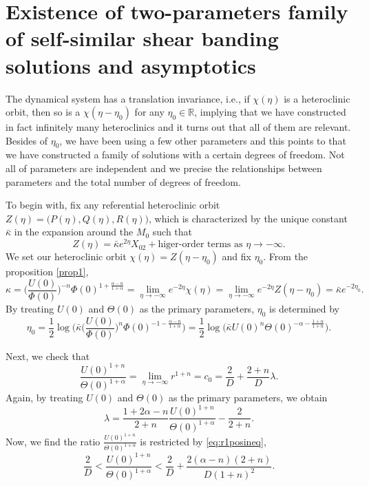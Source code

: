 \documentclass[a4paper,11pt]{article}
\begin{document}
\section{Existence of two-parameters family of self-similar shear banding solutions and asymptotics}
The dynamical system has a translation invariance, i.e., if $\chi(\eta)$ is a heteroclinic orbit, then so is a $\chi(\eta-\eta_0)$ for any $\eta_0\in \mathbb{R}$, implying that we have constructed in fact infinitely many heteroclinics and it turns out that all of them are relevant.  Besides of $\eta_0$, we have been using a few other parameters and this points to that we have constructed a family of solutions with a certain degrees of freedom. Not all of parameters are independent and we precise the relationships between parameters and the total number of degrees of freedom.

To begin with, fix any referential heteroclinic orbit $Z(\eta)=\big(P(\eta),Q(\eta),R(\eta)\big)$, which is characterized by the unique constant $\bar{\kappa}$ in the expansion around the $M_0$ such that
$$ Z(\eta) = \bar{\kappa}e^{2\eta}X_{02} + \text{higer-order terms as $\eta \rightarrow -\infty$.}$$%
We set our heteroclinic orbit $\chi(\eta) = Z(\eta-\eta_0)$ and fix $\eta_0$. From the proposition \ref{prop1}, 
$$ \kappa = \Big(\frac{U(0)}{\Phi(0)}\Big)^{-n}\Phi(0)^{1+\frac{\alpha-n}{1+\alpha}}=\lim_{\eta \rightarrow -\infty} e^{-2\eta}\chi(\eta)  = \lim_{\eta \rightarrow -\infty} e^{-2\eta} Z(\eta-\eta_0) =\bar{\kappa}e^{-2\eta_0}.$$
By treating $U(0)$ and $\Theta(0)$ as the primary parameters, $\eta_0$ is determined by
\begin{equation}
 \eta_0 = \frac{1}{2} \log\Big(\bar{\kappa} \Big(\frac{U(0)}{\Phi(0)}\Big)^{n}\Phi(0)^{-1-\frac{\alpha-n}{1+\alpha}}  \Big) = \frac{1}{2} \log\Big(\bar{\kappa} U(0)^n \Theta(0)^{-\alpha-\frac{1+\alpha}{1+n}}  \Big). \label{eq:eta0}
\end{equation}

Next, we check that 
$$ \frac{U(0)^{1+n}}{\Theta(0)^{1+\alpha}} = \lim_{\eta \rightarrow -\infty} r^{1+n} = c_0 = \frac{2}{D} + \frac{2+n}{D}\lambda.$$
Again, by treating $U(0)$ and $\Theta(0)$ as the primary parameters, we obtain
\begin{equation}
 \lambda = \frac{1+2\alpha-n}{2+n}\frac{U(0)^{1+n}}{\Theta(0)^{1+\alpha}} - \frac{2}{2+n}. \label{eq:lambda}
\end{equation}
Now, we find the ratio $\frac{U(0)^{1+n}}{\Theta(0)^{1+\alpha}}$ is restricted by \eqref{eq:r1posineq},
\begin{equation} \label{eq:restriction}
 \frac{2}{D} < \frac{U(0)^{1+n}}{\Theta(0)^{1+\alpha}} < \frac{2}{D} + \frac{2(\alpha-n)(2+n)}{D(1+n)^2}.
\end{equation}
\end{document}
